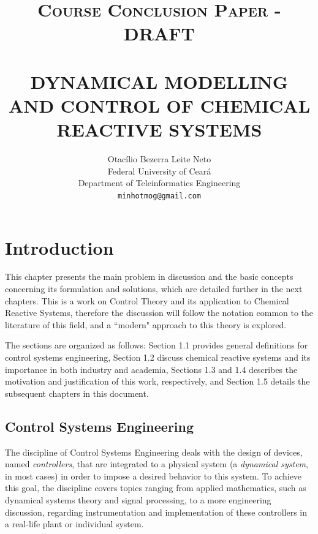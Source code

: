\documentclass[a4paper,11pt]{book}
\title{ \normalsize \textsc{Course Conclusion Paper - DRAFT} 
        \\[2.0cm]             
        \HRule{0.5pt} \\              
        \LARGE \textbf{\uppercase{Dynamical Modelling and Control of Chemical Reactive Systems}}
        \HRule{2pt} \\[0.5cm]  
}
\author{
        Otacílio Bezerra Leite Neto\\   
        Federal University of Ceará\\  
        Department of Teleinformatics Engineering\\
        \texttt{minhotmog@gmail.com} \\
}
\makeatletter
\numberwithin{figure}{chapter}
\numberwithin{equation}{chapter}
\numberwithin{table}{chapter}
\theoremstyle{definition}
\def\printtitle{
    {\centering \@title\par}}
\def\printauthor{
    {\centering \large \@author}}
\makeatother
\begin{document}
\thispagestyle{empty}       %

\printtitle                 %
    \vfill
\printauthor                %
\newpage

\thispagestyle{empty}   
\setcounter{secnumdepth}{1}
\setcounter{tocdepth}{1}
\tableofcontents

\clearpage
\setcounter{page}{1}
\chapter{Introduction}

This chapter presents the main problem in discussion and the basic concepts concerning its formulation and solutions, which are detailed further in the next chapters. This is a work on Control Theory and its application to Chemical Reactive Systems, therefore the discussion will follow the notation common to the literature of this field, and a ``modern" approach to this theory is explored. 

The sections are organized as follows: Section 1.1 provides general definitions for control systems engineering, Section 1.2 discuss chemical reactive systems and its importance in both industry and academia, Sections 1.3 and 1.4 describes the motivation and justification of this work, respectively, and Section 1.5 details the subsequent chapters in this document.

\section{Control Systems Engineering}

The discipline of Control Systems Engineering deals with the design of devices, named \textit{controllers}, that are integrated to a physical system (a \textit{dynamical system}, in most cases) in order to impose a desired behavior to this system. To achieve this goal, the discipline covers topics ranging from applied mathematics, such as dynamical systems theory and signal processing, to a more engineering discussion, regarding instrumentation and implementation of these controllers in a real-life plant or individual system. 
\end{document}
